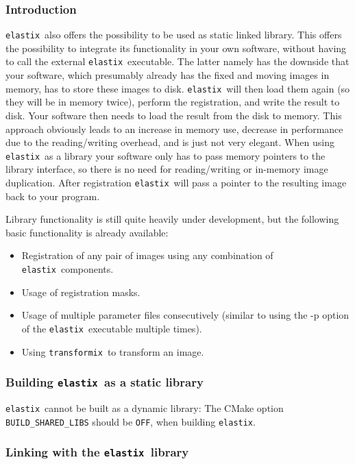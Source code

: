 \documentclass[]{report}
\newcommand{\elastix}{\texttt{elastix}}
\newcommand{\transformix}{\texttt{transformix}}
\begin{document}
\subsubsection{Introduction}

\elastix\ also offers the possibility to be used as 
static linked library. This offers the possibility to integrate its
functionality in your own software, without having to call the
external \elastix\ executable. The latter namely has the downside
that your software, which presumably already has the fixed and
moving images in memory, has to store these images to disk.
\elastix\ will then load them again (so they will be in memory
twice), perform the registration, and write the result to disk. Your
software then needs to load the result from the disk to memory. This
approach obviously leads to an increase in memory use, decrease in
performance due to the reading/writing overhead, and is just not
very elegant. When using \elastix\ as a library your software only
has to pass memory pointers to the library interface, so there is no
need for reading/writing or in-memory image duplication. After
registration \elastix\ will pass a pointer to the resulting image
back to your program.

Library functionality is still quite heavily under development, but
the following basic functionality is already available:
\begin{itemize}
\item Registration of any pair of images using any combination of
\elastix\ components.

\item Usage of registration masks.

\item Usage of multiple parameter files consecutively (similar to
using the -p option of the \elastix\ executable multiple times).

\item Using \transformix\ to transform an image.
\end{itemize}

\subsubsection{Building \elastix\ as a static library}

\elastix\ cannot be built as a dynamic library:
The CMake option \texttt{BUILD\_SHARED\_LIBS} should be \texttt{OFF},
when building \elastix.

\subsubsection{Linking with the \elastix\ library}
\end{document}
